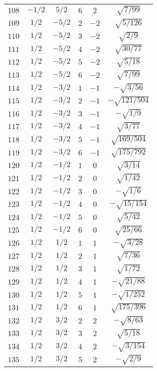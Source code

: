 \begin{table}
\begin{center}
\begin{tabular}{|c|c|c|c|c|c|}
$108$ & $-1/2$ & $5/2$ & $6$ & $2$ & $\sqrt{7/99}$ \\ 
$109$ & $1/2$ & $-5/2$ & $2$ & $-2$ & $\sqrt{5/126}$ \\ 
$110$ & $1/2$ & $-5/2$ & $3$ & $-2$ & $\sqrt{2/9}$ \\ 
$111$ & $1/2$ & $-5/2$ & $4$ & $-2$ & $\sqrt{30/77}$ \\ 
$112$ & $1/2$ & $-5/2$ & $5$ & $-2$ & $\sqrt{5/18}$ \\ 
$113$ & $1/2$ & $-5/2$ & $6$ & $-2$ & $\sqrt{7/99}$ \\ 
$114$ & $1/2$ & $-3/2$ & $1$ & $-1$ & $-\sqrt{3/56}$ \\ 
$115$ & $1/2$ & $-3/2$ & $2$ & $-1$ & $-\sqrt{121/504}$ \\ 
$116$ & $1/2$ & $-3/2$ & $3$ & $-1$ & $-\sqrt{1/9}$ \\ 
$117$ & $1/2$ & $-3/2$ & $4$ & $-1$ & $\sqrt{3/77}$ \\ 
$118$ & $1/2$ & $-3/2$ & $5$ & $-1$ & $\sqrt{169/504}$ \\ 
$119$ & $1/2$ & $-3/2$ & $6$ & $-1$ & $\sqrt{175/792}$ \\ 
$120$ & $1/2$ & $-1/2$ & $1$ & $0$ & $\sqrt{3/14}$ \\ 
$121$ & $1/2$ & $-1/2$ & $2$ & $0$ & $\sqrt{1/42}$ \\ 
$122$ & $1/2$ & $-1/2$ & $3$ & $0$ & $-\sqrt{1/6}$ \\ 
$123$ & $1/2$ & $-1/2$ & $4$ & $0$ & $-\sqrt{15/154}$ \\ 
$124$ & $1/2$ & $-1/2$ & $5$ & $0$ & $\sqrt{5/42}$ \\ 
$125$ & $1/2$ & $-1/2$ & $6$ & $0$ & $\sqrt{25/66}$ \\ 
$126$ & $1/2$ & $1/2$ & $1$ & $1$ & $-\sqrt{3/28}$ \\ 
$127$ & $1/2$ & $1/2$ & $2$ & $1$ & $\sqrt{7/36}$ \\ 
$128$ & $1/2$ & $1/2$ & $3$ & $1$ & $\sqrt{1/72}$ \\ 
$129$ & $1/2$ & $1/2$ & $4$ & $1$ & $-\sqrt{21/88}$ \\ 
$130$ & $1/2$ & $1/2$ & $5$ & $1$ & $-\sqrt{1/252}$ \\ 
$131$ & $1/2$ & $1/2$ & $6$ & $1$ & $\sqrt{175/396}$ \\ 
$132$ & $1/2$ & $3/2$ & $2$ & $2$ & $-\sqrt{8/63}$ \\ 
$133$ & $1/2$ & $3/2$ & $3$ & $2$ & $\sqrt{5/18}$ \\ 
$134$ & $1/2$ & $3/2$ & $4$ & $2$ & $-\sqrt{3/154}$ \\ 
$135$ & $1/2$ & $3/2$ & $5$ & $2$ & $-\sqrt{2/9}$ \\ 

\end{tabular}
\end{center}
\end{table}

